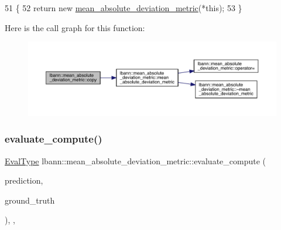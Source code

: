 \begin{DoxyCode}
51                                                         \{
52     \textcolor{keywordflow}{return} \textcolor{keyword}{new} \hyperlink{classlbann_1_1mean__absolute__deviation__metric_afb98a53d7a6f0981d80f5c74fd6ce25a}{mean\_absolute\_deviation\_metric}(*\textcolor{keyword}{this});
53   \}
\end{DoxyCode}
Here is the call graph for this function\+:\nopagebreak
\begin{figure}[H]
\begin{center}
\leavevmode
\includegraphics[width=350pt]{classlbann_1_1mean__absolute__deviation__metric_ad49148043214908a671799bcdd0b120b_cgraph}
\end{center}
\end{figure}
\mbox{\label{classlbann_1_1mean__absolute__deviation__metric_a4096a6f389b2f18ff6c19428313f2969}} 
\subsubsection{\texorpdfstring{evaluate\+\_\+compute()}{evaluate\_compute()}}
{\footnotesize\ttfamily \hyperlink{base_8hpp_a3266f5ac18504bbadea983c109566867}{Eval\+Type} lbann\+::mean\+\_\+absolute\+\_\+deviation\+\_\+metric\+::evaluate\+\_\+compute (\begin{DoxyParamCaption}\item[{const \hyperlink{base_8hpp_a9a697a504ae84010e7439ffec862b470}{Abs\+Dist\+Mat} \&}]{prediction,  }\item[{const \hyperlink{base_8hpp_a9a697a504ae84010e7439ffec862b470}{Abs\+Dist\+Mat} \&}]{ground\+\_\+truth }\end{DoxyParamCaption})\hspace{0.3cm}{\ttfamily [override]}, {\ttfamily [protected]}, {\ttfamily [virtual]}}

